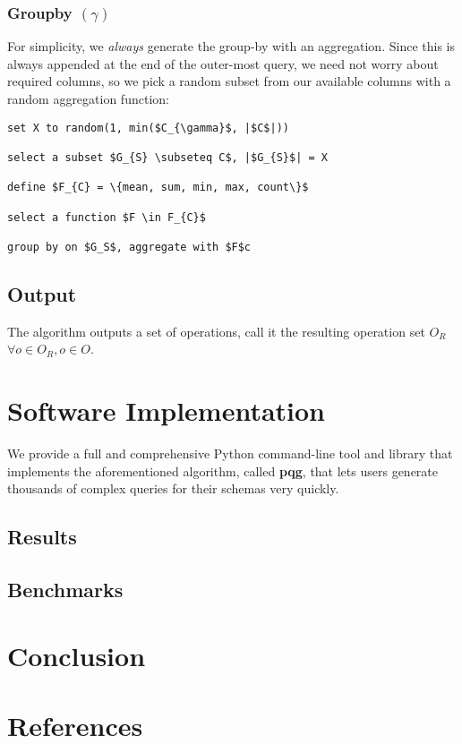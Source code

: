 \documentclass[10pt, twocolumn]{article}
\begin{document}
\subsubsection*{Groupby $(\gamma)$}

For simplicity, we \textit{always} generate the group-by with an aggregation. Since this is always appended at the end of the outer-most query, we need not worry about required columns, so we pick a random subset from our available columns with a random aggregation function:

\spacing
\begin{lstlisting}
set X to random(1, min($C_{\gamma}$, |$C$|))

select a subset $G_{S} \subseteq C$, |$G_{S}$| = X

define $F_{C} = \{mean, sum, min, max, count\}$

select a function $F \in F_{C}$

group by on $G_S$, aggregate with $F$c
\end{lstlisting}

\subsection*{Output}

The algorithm outputs a set of operations, call it the resulting operation set $O_{R}$  $\forall o \in O_{R}, o \in O$.

\section{Software Implementation}

We provide a full and comprehensive Python command-line tool and library that implements the aforementioned algorithm, called \textbf{pqg}, that lets users generate thousands of complex queries for their schemas very quickly.

\subsection*{Results}

\subsection*{Benchmarks}

\section{Conclusion}

\section{References}
\end{document}
